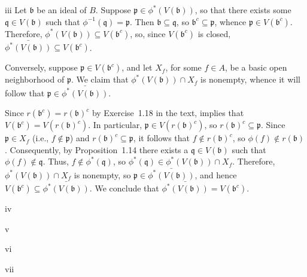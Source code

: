 \begin{partsolution}{iii}
Let \(\mathfrak{b}\) be an ideal of \(B\).
Suppose \(\mathfrak{p} \in \phi^*(V(\mathfrak{b}))\), so that there exists some \(\mathfrak{q} \in V(\mathfrak{b})\) such that \(\phi^{-1}(\mathfrak{q}) = \mathfrak{p}\).
Then \(\mathfrak{b} \subseteq \mathfrak{q}\), so \(\mathfrak{b}^c \subseteq \mathfrak{p}\), whence \(\mathfrak{p} \in V(\mathfrak{b}^c)\).
Therefore, \(\phi^*(V(\mathfrak{b})) \subseteq V(\mathfrak{b}^c)\), so, since \(V(\mathfrak{b}^c)\) is closed, \(\bar{\phi^*(V(\mathfrak{b}))} \subseteq V(\mathfrak{b}^c)\).

Conversely, suppose \(\mathfrak{p} \in V(\mathfrak{b}^c)\), and let \(X_f\), for some \(f \in A\), be a basic open neighborhood of \(\mathfrak{p}\).
We claim that \(\phi^*(V(\mathfrak{b})) \cap X_f\) is nonempty, whence it will follow that \(\mathfrak{p} \in \bar{\phi^*(V(\mathfrak{b}))}\).

Since \(r(\mathfrak{b}^c) = r(\mathfrak{b})^c\) by Exercise~1.18 in the text,  implies that \(V(\mathfrak{b}^c) = V(r(\mathfrak{b})^c)\).
In particular, \(\mathfrak{p} \in V(r(\mathfrak{b})^c)\), so \(r(\mathfrak{b})^c \subseteq \mathfrak{p}\).
Since \(\mathfrak{p} \in X_f\) (i.e., \(f \notin \mathfrak{p}\)) and \(r(\mathfrak{b})^c \subseteq \mathfrak{p}\), it follows that \(f \notin r(\mathfrak{b})^c\), so \(\phi(f) \notin r(\mathfrak{b})\).
Consequently, by Proposition~1.14 there exists a \(\mathfrak{q} \in V(\mathfrak{b})\) such that \(\phi(f) \notin \mathfrak{q}\).
Thus, \(f \notin \phi^*(\mathfrak{q})\), so \(\phi^*(\mathfrak{q}) \in \phi^*(V(\mathfrak{b})) \cap X_f\).
Therefore, \(\phi^*(V(\mathfrak{b})) \cap X_f\) is nonempty, so \(\mathfrak{p} \in \bar{\phi^*(V(\mathfrak{b}))}\), and hence \(V(\mathfrak{b}^c) \subseteq \bar{\phi^*(V(\mathfrak{b}))}\).
We conclude that \(\bar{\phi^*(V(\mathfrak{b}))} = V(\mathfrak{b}^c)\).
\end{partsolution}

\begin{partsolution}{iv}

\end{partsolution}

\begin{partsolution}{v}

\end{partsolution}

\begin{partsolution}{vi}

\end{partsolution}

\begin{partsolution}{vii}

\end{partsolution}